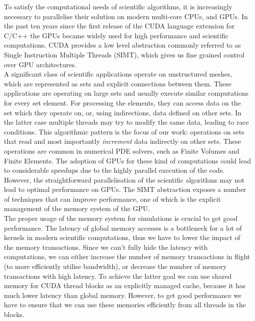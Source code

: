 To satisfy the computational needs of scientific algorithms, it is increasingly
necessary to parallelise their solution on modern multi-core CPUs, and GPUs. In
the past ten years since the first release of the CUDA language extension for
C/C++ the GPUs became widely used for high performance and scientific
computations. CUDA provides a low level abstraction commonly referred to as
Single Instruction Multiple Threads (SIMT), which gives us fine grained control
over GPU architectures. \\
A significant class of scientific applications operate on unstructured meshes,
which are represented as sets and explicit connections between them. These
applications are operating on large sets and usually execute similar
computations for every set element. For processing the elements, they can
access data on the set which they operate on, or, using indirections, data
defined on other sets. In the latter case multiple threads may try to modify
the same data, leading to race conditions. This algorithmic pattern is the
focus of our work: operations on sets that read and most importantly
\emph{increment} data indirectly on other sets. These operations are common in
numerical PDE solvers, such as Finite Volumes and Finite Elements. The adoption
of GPUs for these kind of computations could lead to considerable speedups due
to the highly parallel execution of the code. However, the straightforward
parallelisation of the scientific algorithms may not lead to optimal
performance on GPUs. The SIMT abstraction exposes a number of techniques that
can improve performance, one of which is the explicit management of the memory
system of the GPU.\\
The proper usage of the memory system for simulations is crucial to get good
performance. The latency of global memory accesses is a bottleneck for a lot of
kernels in modern scientific computations, thus we have to lower the impact of
the memory transactions. Since we can't fully hide the latency with
computations, we can either increase the number of memory transactions in
flight (to more efficiently utilise bandwidth), or decrease the number of
memory transactions with high latency. To achieve the latter goal we can use
shared memory for CUDA thread blocks as an explicitly managed cache, because it
has much lower latency than global memory. However, to get good performance we
have to ensure that we can use these memories efficiently from all threads in
the blocks.


